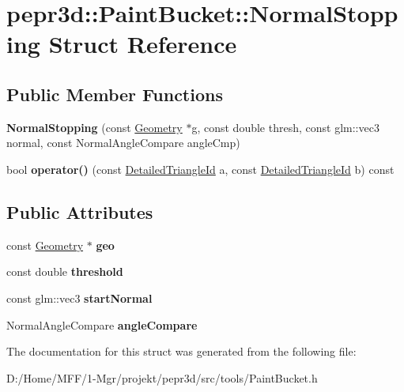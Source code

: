 \hypertarget{structpepr3d_1_1_paint_bucket_1_1_normal_stopping}{}\section{pepr3d\+::Paint\+Bucket\+::Normal\+Stopping Struct Reference}
\label{structpepr3d_1_1_paint_bucket_1_1_normal_stopping}
\subsection*{Public Member Functions}
\begin{DoxyCompactItemize}
\item 
\mbox{\label{structpepr3d_1_1_paint_bucket_1_1_normal_stopping_a432e44cb675c28037b7a045ed547669d}} 
{\bfseries Normal\+Stopping} (const \mbox{\hyperlink{classpepr3d_1_1_geometry}{Geometry}} $\ast$g, const double thresh, const glm\+::vec3 normal, const Normal\+Angle\+Compare angle\+Cmp)
\item 
\mbox{\label{structpepr3d_1_1_paint_bucket_1_1_normal_stopping_a9d143a0bc957e837cc897c316bf5268b}} 
bool {\bfseries operator()} (const \mbox{\hyperlink{structpepr3d_1_1_detailed_triangle_id}{Detailed\+Triangle\+Id}} a, const \mbox{\hyperlink{structpepr3d_1_1_detailed_triangle_id}{Detailed\+Triangle\+Id}} b) const
\end{DoxyCompactItemize}
\subsection*{Public Attributes}
\begin{DoxyCompactItemize}
\item 
\mbox{\label{structpepr3d_1_1_paint_bucket_1_1_normal_stopping_aa5d1412d6141322da3fa57a776c0204e}} 
const \mbox{\hyperlink{classpepr3d_1_1_geometry}{Geometry}} $\ast$ {\bfseries geo}
\item 
\mbox{\label{structpepr3d_1_1_paint_bucket_1_1_normal_stopping_a1c743104c8209ec02b57b838a96f88ab}} 
const double {\bfseries threshold}
\item 
\mbox{\label{structpepr3d_1_1_paint_bucket_1_1_normal_stopping_a85815d0a0c3f538de4d9ebd2cba55a6d}} 
const glm\+::vec3 {\bfseries start\+Normal}
\item 
\mbox{\label{structpepr3d_1_1_paint_bucket_1_1_normal_stopping_acc4c4a6791bf77f208ec4ee34939488e}} 
Normal\+Angle\+Compare {\bfseries angle\+Compare}
\end{DoxyCompactItemize}


The documentation for this struct was generated from the following file\+:\begin{DoxyCompactItemize}
\item 
D\+:/\+Home/\+M\+F\+F/1-\/\+Mgr/projekt/pepr3d/src/tools/Paint\+Bucket.\+h\end{DoxyCompactItemize}
